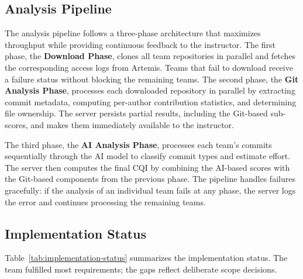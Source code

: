 \documentclass[sigconf]{acmart}
\begin{document}
\subsection{Analysis Pipeline}

The analysis pipeline follows a three-phase architecture that maximizes throughput while providing continuous feedback to the instructor. The first phase, the \textbf{Download Phase}, clones all team repositories in parallel and fetches the corresponding access logs from Artemis. Teams that fail to download receive a failure status without blocking the remaining teams. The second phase, the \textbf{Git Analysis Phase}, processes each downloaded repository in parallel by extracting commit metadata, computing per-author contribution statistics, and determining file ownership. The server persists partial results, including the Git-based sub-scores, and makes them immediately available to the instructor.

The third phase, the \textbf{AI Analysis Phase}, processes each team's commits sequentially through the AI model to classify commit types and estimate effort. The server then computes the final CQI by combining the AI-based scores with the Git-based components from the previous phase. The pipeline handles failures gracefully: if the analysis of an individual team fails at any phase, the server logs the error and continues processing the remaining teams.

\subsection{Implementation Status}

Table~\ref{tab:implementation-status} summarizes the implementation status. The team fulfilled most requirements; the gaps reflect deliberate scope decisions.
\end{document}
